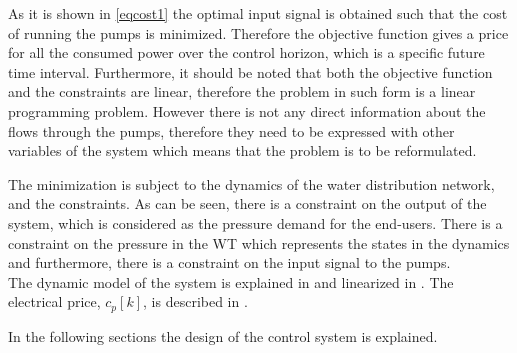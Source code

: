As it is shown in \eqref{eqcost1} the optimal input signal is obtained such that the cost of running the pumps is minimized. Therefore the objective function gives a price for all the consumed power over the control horizon, which is a specific future time interval. Furthermore, it should be noted that both the objective function and the constraints are linear, therefore the problem in such form is a linear programming problem. However there is not any direct information about the flows through the pumps, therefore they need to be expressed with other variables of the system which means that the problem is to be reformulated.

The minimization is subject to the dynamics of the water distribution network, and the constraints. As can be seen, there is a constraint on the output of the system, which is considered as the pressure demand for the end-users. There is a constraint on the pressure in the WT which represents the states in the dynamics and furthermore, there is a constraint on the input signal to the pumps. 
\\
The dynamic model of the system is explained in  and linearized in . The electrical price, $c_p[k]$, is described in . %

In the following sections the design of the control system is explained. 







